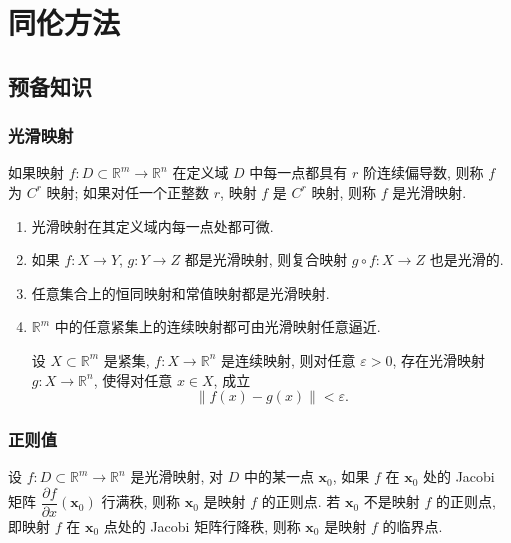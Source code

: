 \section{同伦方法}
\subsection{预备知识}
\subsubsection{光滑映射}

\begin{definition}
  如果映射 \(f:D\subset\mathbb{R}^m\to\mathbb{R}^n\) 在定义域 \(D\) 中每一点都具有 \(r\) 阶连续偏导数, 则称 \(f\) 为 \(C^r\) 映射; 如果对任一个正整数 \(r\), 映射 \(f\) 是 \(C^r\) 映射, 则称 \(f\) 是光滑映射.
\end{definition}

\begin{enumerate}
  \item 光滑映射在其定义域内每一点处都可微.
  \item 如果 \(f:X\to Y\), \(g:Y\to Z\) 都是光滑映射, 则复合映射 \(g\circ f:X\to Z\) 也是光滑的.
  \item 任意集合上的恒同映射和常值映射都是光滑映射.
  \item \(\mathbb{R}^m\) 中的任意紧集上的连续映射都可由光滑映射任意逼近.
    \begin{theorem}
      设 \(X\subset\mathbb{R}^m\) 是紧集, \(f: X\to\mathbb{R}^n\) 是连续映射, 则对任意 \(\varepsilon > 0\), 存在光滑映射 \(g: X\to\mathbb{R}^n\), 使得对任意 \(x\in X\), 成立
      \begin{equation*}
        \left\lVert f(x)-g(x)\right\rVert < \varepsilon.
      \end{equation*}
    \end{theorem}
\end{enumerate}

\subsubsection{正则值}

\begin{definition}
  设 \(f:D\subset\mathbb{R}^m\to\mathbb{R}^n\) 是光滑映射, 对 \(D\) 中的某一点 \(\boldsymbol{x}_0\), 如果 \(f\) 在 \(\boldsymbol{x}_0\) 处的 Jacobi 矩阵 \(\dfrac{\partial f}{\partial x}\left(\boldsymbol{x}_0\right)\) 行满秩, 则称 \(\boldsymbol{x}_0\) 是映射 \(f\) 的正则点. 若 \(\boldsymbol{x}_0\) 不是映射 \(f\) 的正则点, 即映射 \(f\) 在 \(\boldsymbol{x}_0\) 点处的 Jacobi 矩阵行降秩, 则称 \(\boldsymbol{x}_0\) 是映射 \(f\) 的临界点.
\end{definition}

